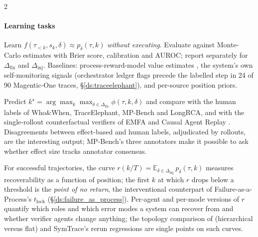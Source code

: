 \begin{multicols}{2}
\paragraph{Learning tasks}
\begin{description}[leftmargin=1.4em,style=nextline,itemsep=1pt]
\item[T1 --- Outcome prediction (the surrogate).] Learn $f(\tau_{<k},s_k,\delta)\approx p_\delta(\tau,k)$ \emph{without executing}. Evaluate against Monte-Carlo estimates with Brier score, calibration and AUROC; report separately for $\Delta_{\mathrm{fix}}$ and $\Delta_{\mathrm{inj}}$. Baselines: process-reward-model value estimates \cite{wang2024mathshepherd}, the system's own self-monitoring signals (orchestrator ledger flags precede the labelled step in 24 of 90 Magentic-One traces, \S\ref{ds:traceelephant}), and per-source position priors.
\item[T2 --- Attribution by effect.] Predict $k^\star=\arg\max_k\max_{\delta\in\Delta_{\mathrm{fix}}}\phi(\tau,k,\delta)$ and compare with the human labels of Who\&When, TraceElephant, MP-Bench and LongRCA, and with the single-rollout counterfactual verifiers of EMFA and Causal Agent Replay \cite{liao2026emfa,shah2026car}. Disagreements between effect-based and human labels, adjudicated by rollouts, are the interesting output; MP-Bench's three annotators make it possible to ask whether effect size tracks annotator consensus.
\item[T3 --- Fragility and lock-in.] For successful trajectories, the curve $r(k/T)=\mathbb{E}_{\delta\in\Delta_{\mathrm{inj}}}\,p_\delta(\tau,k)$ measures recoverability as a function of position; the first $k$ at which $r$ drops below a threshold is the \emph{point of no return}, the interventional counterpart of Failure-as-a-Process's $t_{\mathrm{lock}}$ (\S\ref{ds:failure_as_process}). Per-agent and per-mode versions of $r$ quantify which roles and which error modes a system can recover from and whether verifier agents change anything; the topology comparison of \citet{huang2024resilience} (hierarchical versus flat) and SymTrace's rerun regressions \cite{luan2026symtrace} are single points on such curves.
\end{description}


\end{multicols}
